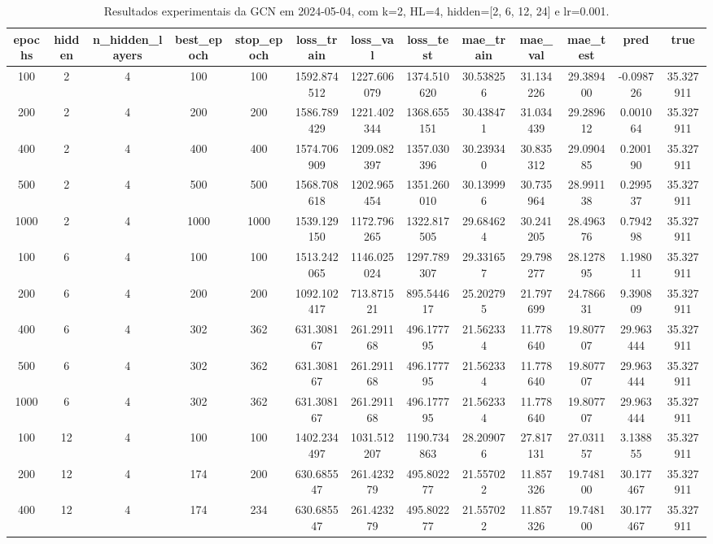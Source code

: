 \begin{table}[h]
\centering
\caption{Resultados experimentais da GCN em 2024-05-04, com k=2, HL=4, hidden=[2, 6, 12, 24] e lr=0.001.}
\label{tab:gcn_results_k2_hl4_d20240504}
\begin{tabular}{ccccccccccccc}
\toprule
epochs & hidden & n\_hidden\_layers & best\_epoch & stop\_epoch & loss\_train & loss\_val & loss\_test & mae\_train & mae\_val & mae\_test & pred & true \\
\midrule
100 & 2 & 4 & 100 & 100 & 1592.874512 & 1227.606079 & 1374.510620 & 30.538256 & 31.134226 & 29.389400 & -0.098726 & 35.327911 \\
200 & 2 & 4 & 200 & 200 & 1586.789429 & 1221.402344 & 1368.655151 & 30.438471 & 31.034439 & 29.289612 & 0.001064 & 35.327911 \\
400 & 2 & 4 & 400 & 400 & 1574.706909 & 1209.082397 & 1357.030396 & 30.239340 & 30.835312 & 29.090485 & 0.200190 & 35.327911 \\
500 & 2 & 4 & 500 & 500 & 1568.708618 & 1202.965454 & 1351.260010 & 30.139996 & 30.735964 & 28.991138 & 0.299537 & 35.327911 \\
1000 & 2 & 4 & 1000 & 1000 & 1539.129150 & 1172.796265 & 1322.817505 & 29.684624 & 30.241205 & 28.496376 & 0.794298 & 35.327911 \\
100 & 6 & 4 & 100 & 100 & 1513.242065 & 1146.025024 & 1297.789307 & 29.331657 & 29.798277 & 28.127895 & 1.198011 & 35.327911 \\
200 & 6 & 4 & 200 & 200 & 1092.102417 & 713.871521 & 895.544617 & 25.202795 & 21.797699 & 24.786631 & 9.390809 & 35.327911 \\
400 & 6 & 4 & 302 & 362 & 631.308167 & 261.291168 & 496.177795 & 21.562334 & 11.778640 & 19.807707 & 29.963444 & 35.327911 \\
500 & 6 & 4 & 302 & 362 & 631.308167 & 261.291168 & 496.177795 & 21.562334 & 11.778640 & 19.807707 & 29.963444 & 35.327911 \\
1000 & 6 & 4 & 302 & 362 & 631.308167 & 261.291168 & 496.177795 & 21.562334 & 11.778640 & 19.807707 & 29.963444 & 35.327911 \\
100 & 12 & 4 & 100 & 100 & 1402.234497 & 1031.512207 & 1190.734863 & 28.209076 & 27.817131 & 27.031157 & 3.138855 & 35.327911 \\
200 & 12 & 4 & 174 & 200 & 630.685547 & 261.423279 & 495.802277 & 21.557022 & 11.857326 & 19.748100 & 30.177467 & 35.327911 \\
400 & 12 & 4 & 174 & 234 & 630.685547 & 261.423279 & 495.802277 & 21.557022 & 11.857326 & 19.748100 & 30.177467 & 35.327911 \\

\end{tabular}
\end{table}
